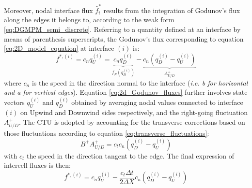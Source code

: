 Moreover, nodal interface flux $\hat{f}_i^{*}$ results from the integration of Godunov's flux along the edges it belongs to, according to the weak form \eqref{eq:DGMPM_semi_discrete}.
Referring to a quantity defined at an interface by means of parenthesis superscripts, the Godunov's flux corresponding to equation \eqref{eq:2D_model_equation} at interface $(i)$ is:
\begin{equation}
  \label{eq:2d_Godunov_fluxes}
  f^{*,(i)}= c_n q^{(i)}_U = \underbrace{c_nq^{(i)}_D}_{f_N(q^{(i)}_D)} - \underbrace{c_n (q^{(i)}_D -q^{(i)}_U)}_{A^{+}_{U/D}} 
\end{equation}
where $c_n$ is the speed in the direction normal to the interface (\textit{i.e. b for horizontal and a for vertical edges}). Equation \eqref{eq:2d_Godunov_fluxes} further involves state vectors $q^{(i)}_U$ and $q^{(i)}_D$ obtained by averaging nodal values connected to interface $(i)$ on Upwind and Downwind sides respectively, and the right-going fluctuation $A_{U/D}^+$.
The CTU is adopted by accounting for the transverse corrections based on those fluctuations according to equation \eqref{eq:transverse_fluctuations}:
\begin{equation}
  \label{eq:2D_transverse_corrections}
  B^+A^+_{U/D}=c_t c_n (q^{(i)}_D -q^{(i)}_U)
\end{equation}
with $c_t$ the speed in the direction tangent to the edge. The final expression of intercell fluxes is then:
\begin{equation}
  \label{eq:intercell_flux}
  f^{*,(i)}=c_nq^{(i)}_U - \frac{c_t\Delta t}{2\Delta X} c_n (q^{(i)}_D -q^{(i)}_U)
\end{equation}

